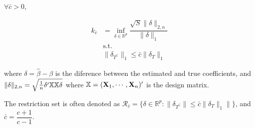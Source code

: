 \begin{Def}
$\forall \bar{c} > 0$,

\begin{align*}
k_{\bar{c}} &= \inf_{\delta \in \mathbb{R}^p}{
    \dfrac{\sqrt{S} \|\delta\|_{2, n}}{\|\delta\|_1}
}\\
&\text{s.t.}\\
&\|\delta_{T^{\complement}}\|_1 \leq \bar{c} \|\delta_T\|_1
\end{align*}

where $\delta = \hat{\beta} - \beta$ is the diference between the estimated and true coefficients, and $\|\delta\|_{2, n} = \sqrt{\frac{1}{n} \delta'\mathbb{X}\mathbb{X}\delta}$ where $\mathbb{X} = (\mathbf{X}_1, \cdots, \mathbf{X}_n)'$ is the design matrix.

The restriction set is often denoted as $\mathcal{R}_{\bar{c}} = \{\delta \in \mathbb{R}^p: \|\delta_{T^\complement}\| \leq \bar{c} \|\delta_T\|_1\|\}$, and $\bar{c} = \dfrac{c+1}{c-1}$.
\end{Def}
